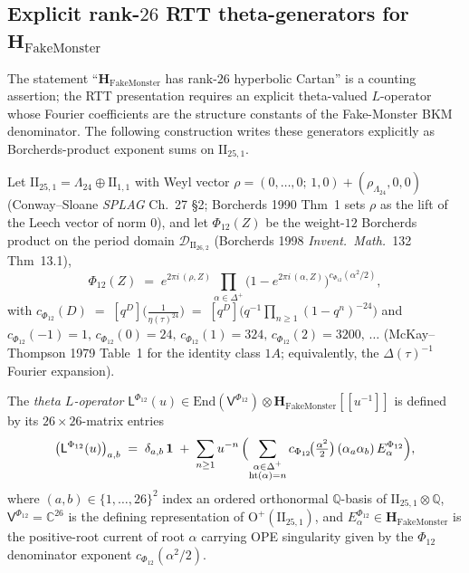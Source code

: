 \subsection{Explicit rank-\texorpdfstring{$26$}{26} RTT theta-generators for \texorpdfstring{$\mathbf H_{\mathrm{FakeMonster}}$}{H-FakeMonster}}
\label{subsec:k3ebkm-fake-monster-rtt}

The statement ``$\mathbf H_{\mathrm{FakeMonster}}$ has rank-$26$
hyperbolic Cartan'' is a counting assertion; the RTT presentation
requires an explicit theta-valued $L$-operator whose Fourier
coefficients are the structure constants of the Fake-Monster BKM
denominator. The following construction writes these generators
explicitly as Borcherds-product exponent sums on $\mathrm{II}_{25,1}$.

\begin{definition}
\label{def:k3ebkm-fake-monster-L-operator}
Let $\mathrm{II}_{25,1} = \Lambda_{24}\oplus\mathrm{II}_{1,1}$ with
Weyl vector $\rho = (0,\ldots,0;\,1,0) + (\rho_{\Lambda_{24}},0,0)$
(Conway--Sloane \emph{SPLAG} Ch.~27 \S2; Borcherds 1990 Thm~1 sets
$\rho$ as the lift of the Leech vector of norm $0$), and let
$\Phi_{12}(Z)$ be the weight-$12$ Borcherds product on the period
domain $\mathcal D_{\mathrm{II}_{26,2}}$ (Borcherds 1998
\emph{Invent.\ Math.}~132 Thm~13.1),
\[
 \Phi_{12}(Z) \;=\; e^{2\pi i\,(\rho, Z)}
 \prod_{\alpha\in\Delta^+}
 \bigl(1 - e^{2\pi i\,(\alpha, Z)}\bigr)^{c_{\Phi_{12}}(\alpha^2/2)},
\]
with $c_{\Phi_{12}}(D) \;=\; [q^D]\bigl(\tfrac{1}{\eta(\tau)^{24}}\bigr)
\;=\;[q^D]\bigl(q^{-1}\prod_{n\ge 1}(1-q^n)^{-24}\bigr)$ and
$c_{\Phi_{12}}(-1) = 1,\, c_{\Phi_{12}}(0) = 24,\,
c_{\Phi_{12}}(1) = 324,\, c_{\Phi_{12}}(2) = 3200,\,\ldots$
(McKay--Thompson 1979 Table~1 for the identity class $1A$; equivalently,
the $\Delta(\tau)^{-1}$ Fourier expansion).

The \emph{theta $L$-operator}
$\mathsf L^{\Phi_{12}}(u)\in\mathrm{End}(\mathsf{V}^{\Phi_{12}})\otimes
\mathbf H_{\mathrm{FakeMonster}}[[u^{-1}]]$
is defined by its $26\times 26$-matrix entries
\begin{equation}
\label{eq:fake-monster-L-operator}
 \bigl(\mathsf L^{\Phi_{12}}(u)\bigr)_{a,b}
 \;=\;
 \delta_{a,b}\,\mathbf 1
 \;+\;
 \sum_{n\ge 1} u^{-n}\,
 \Bigl(
 \sum_{\substack{\alpha\in\Delta^+ \\ \mathrm{ht}(\alpha) = n}}
 c_{\Phi_{12}}\!\bigl(\tfrac{\alpha^2}{2}\bigr)\,
 (\alpha_a\alpha_b)\,E^{\Phi_{12}}_\alpha
 \Bigr),
\end{equation}
where $(a,b)\in\{1,\ldots,26\}^2$ index an ordered orthonormal
$\mathbb Q$-basis of $\mathrm{II}_{25,1}\otimes\mathbb Q$,
$\mathsf V^{\Phi_{12}} = \mathbb C^{26}$ is the defining
representation of $\mathrm{O}^+(\mathrm{II}_{25,1})$, and
$E^{\Phi_{12}}_\alpha\in\mathbf H_{\mathrm{FakeMonster}}$ is the
positive-root current of root $\alpha$ carrying OPE singularity
given by the $\Phi_{12}$ denominator exponent
$c_{\Phi_{12}}(\alpha^2/2)$.
\end{definition}


